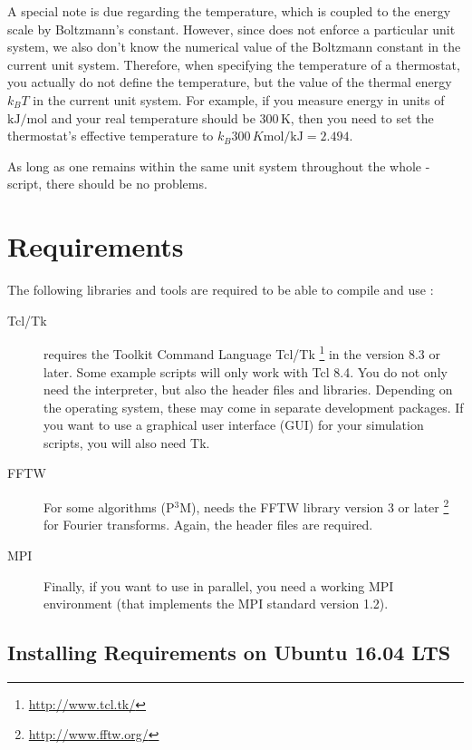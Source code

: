 A special note is due regarding the temperature, which is coupled to
the energy scale by Boltzmann's constant. However, since \es{} does not
enforce a particular unit system, we also don't know the numerical value
of the Boltzmann constant in the current unit system. Therefore, when
specifying the temperature of a thermostat, you actually do not define
the temperature, but the value of the thermal energy $k_B T$ in the
current unit system. For example, if you measure energy in units of
$\mathrm{kJ/mol}$ and your real temperature should be 300\,K, then you need to
set the thermostat's effective temperature to
$k_B 300\, K \mathrm{mol / kJ} = 2.494$.

As long as one remains within the same unit system throughout the
whole \es-script, there should be no problems.

\section{Requirements}
\label{sec:requirements}

The following libraries and tools are required to be able to compile
and use \es:

\begin{description}
\item[Tcl/Tk]  \es{} requires the Toolkit Command
  Language Tcl/Tk \footnote{\url{http://www.tcl.tk/}} in the version
  8.3 or later.  Some example scripts will only work with Tcl 8.4. You
  do not only need the interpreter, but also the header files and
  libraries.  Depending on the operating system, these may come in
  separate development packages. If you want to use a graphical user
  interface (GUI) for your simulation scripts, you will also need Tk.
  
\item[FFTW]  For some algorithms (\eg P$^3$M), \es needs
  the FFTW library version 3 or later
  \footnote{\url{http://www.fftw.org/}} for Fourier transforms.
  Again, the header files are required.
  
\item[MPI]  Finally, if you want to use \es in parallel,
  you need a working MPI environment (that implements the MPI standard
  version 1.2).
\end{description}

\subsection{Installing Requirements on Ubuntu 16.04 LTS}
\label{sec:installing_requirements}

